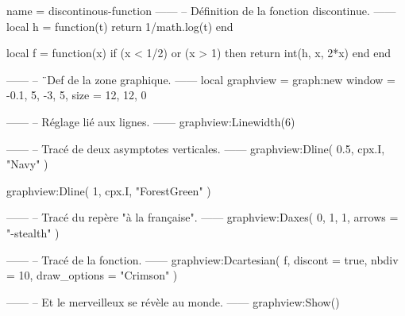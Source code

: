 \documentclass{standalone}
\begin{document}
\begin{luadraw}{name = discontinous-function}
------
-- Définition de la fonction discontinue.
------
local h = function(t)
  return 1/math.log(t)
end

local f = function(x)
  if (x < 1/2) or (x > 1) then
    return int(h, x, 2*x)
  end
end

------
-- ¨Def de la zone graphique.
------
local graphview = graph:new{
  window = {-0.1, 5, -3, 5},
  size   = {12, 12, 0}
}

------
-- Réglage lié aux lignes.
------
graphview:Linewidth(6)

------
-- Tracé de deux asymptotes verticales.
------
graphview:Dline(
  {0.5, cpx.I},
  "Navy"
)

graphview:Dline(
  {1, cpx.I},
  "ForestGreen"
)

------
-- Tracé du repère "à la française".
------
graphview:Daxes(
  {0, 1, 1},
  {arrows = "-stealth"}
)

------
-- Tracé de la fonction.
------
graphview:Dcartesian(
  f,
  {
    discont      = true,
    nbdiv        = 10,
    draw_options = "Crimson"
  }
)

------
-- Et le merveilleux se révèle au monde.
------
graphview:Show()
\end{luadraw}
\end{document}
